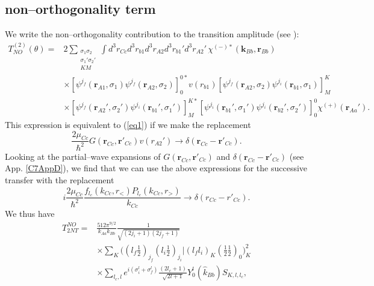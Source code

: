 \subsection{non--orthogonality term}
We write the non--orthogonality contribution to the transition amplitude (see \cite{Bayman:82}):
\begin{equation}\label{129}
 \begin{split}
T_{NO}^{(2)}(\theta)=&2\sum_{\substack{\sigma_1 \sigma_2 \\ \sigma_1' \sigma_2' \\ KM}}\int d^3r_{Cc}d^3r_{b1}d^3r_{A2}
d^3r_{b1}'d^3r_{A2}' \,\chi^{(-)*}(\mathbf{k}_{Bb},\mathbf{r}_{Bb})\\
 & \times \left[ \psi ^{j_f} (\mathbf{r}_{A1},\sigma_1) \psi ^{j_f} (\mathbf{r}_{A2},\sigma_2) \right] _0^{0*} v(r_{b1})
\left[ \psi ^{j_f} (\mathbf{r}_{A2},\sigma_2) \psi ^{j_i} (\mathbf{r}_{b1},\sigma_1) \right] _M^{K}\\
& \times
\left[ \psi ^{j_f} (\mathbf{r}_{A2}',\sigma_2') \psi ^{j_i} (\mathbf{r}_{b1}',\sigma_1') \right] _M^{K*} \left[ \psi ^{j_i} (\mathbf{r}_{b1}',\sigma_1') \psi ^{j_i} (\mathbf{r}_{b2}',\sigma_2') \right] _0^{0}
\chi^{(+)}( \mathbf{r}_{Aa}').
 \end{split}
\end{equation}
This expression is equivalent to (\ref{eq1}) if we make the replacement
\begin{equation}\label{eq136}
    \frac{2\mu_{Cc}}{\hbar^2}G(\mathbf{r}_{Cc},\mathbf{r}'_{Cc})v(r_{A2}')\rightarrow \delta(\mathbf{r}_{Cc}-\mathbf{r}'_{Cc}).
\end{equation}
Looking at the partial--wave expansions of $G(\mathbf{r}_{Cc},\mathbf{r}'_{Cc})$ and $\delta(\mathbf{r}_{Cc}-\mathbf{r}'_{Cc})$ (see App. \ref{C7AppD}), we find that we can use the above expressions for the successive transfer with the replacement
\begin{equation}\label{eq137}
    i\frac{2\mu_{Cc}}{\hbar^2}\frac{f_{l_c}(k_{Cc},r_<)P_{l_c}(k_{Cc},r_>)}{k_{Cc}}\rightarrow \delta(r_{Cc}-r'_{Cc}).
\end{equation}
We thus have
\begin{equation}\label{eq138}
 \begin{split}
T_{2NT}^{NO}=&\frac{512\pi^{9/2}}{ k_{Aa}k_{Bb}}\frac{1}{\sqrt{(2j_i+1)(2j_f+1)}}\\
&\times \sum_{K}
\bigl ( (l_f \tfrac{1}{2})_{j_f} (l_i \tfrac{1}{2})_{j_i} |(l_f l_i)_K (\tfrac{1}{2} \tfrac{1}{2})_0 \bigr )_K ^2\\
&\times \sum_{l_c,l}e^{i(\sigma _i^l+\sigma _f^{l})}\frac{(2l_c+1)}{\sqrt{2l+1}} Y_0^l(\hat k_{Bb})S_{K,l,l_c},
 \end{split}
\end{equation}
